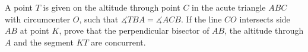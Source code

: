 A point $T$ is given on the altitude through point $C$ in the acute triangle $ABC$ with circumcenter $O$, such that $\measuredangle TBA=\measuredangle ACB$. If the line $CO$ intersects side $AB$ at point $K$, prove that the perpendicular bisector of $AB$, the altitude through $A$ and the segment $KT$ are concurrent.